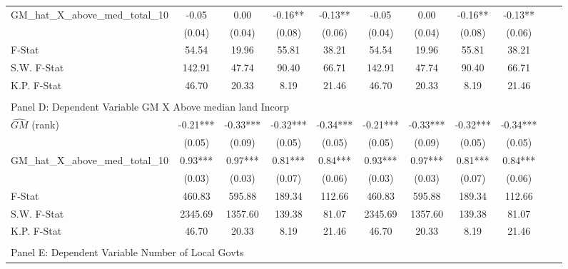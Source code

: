 \begin{table}[htbp]
\begin{threeparttable}
\begin{tabular}{l*{10}{c}}
\addlinespace
GM\_hat\_X\_above\_med\_total\_10&      -0.05   &       0.00   &      -0.16** &      -0.13** &      -0.05   &       0.00   &      -0.16** &      -0.13** \\
                &     (0.04)   &     (0.04)   &     (0.08)   &     (0.06)   &     (0.04)   &     (0.04)   &     (0.08)   &     (0.06)   \\
\midrule
F-Stat          &      54.54   &      19.96   &      55.81   &      38.21   &      54.54   &      19.96   &      55.81   &      38.21   \\
S.W. F-Stat     &     142.91   &      47.74   &      90.40   &      66.71   &     142.91   &      47.74   &      90.40   &      66.71   \\
K.P. F-Stat     &      46.70   &      20.33   &       8.19   &      21.46   &      46.70   &      20.33   &       8.19   &      21.46   \\
\cmidrule[\heavyrulewidth](lr){1-9} \\ \cmidrule[\heavyrulewidth](lr){1-9}
\multicolumn{8}{l}{Panel D: Dependent Variable GM X Above median land Incorp}\\
\cmidrule(lr){1-9}
$\hat{GM}$ (rank)&      -0.21***&      -0.33***&      -0.32***&      -0.34***&      -0.21***&      -0.33***&      -0.32***&      -0.34***\\
                &     (0.05)   &     (0.09)   &     (0.05)   &     (0.05)   &     (0.05)   &     (0.09)   &     (0.05)   &     (0.05)   \\
\addlinespace
GM\_hat\_X\_above\_med\_total\_10&       0.93***&       0.97***&       0.81***&       0.84***&       0.93***&       0.97***&       0.81***&       0.84***\\
                &     (0.03)   &     (0.03)   &     (0.07)   &     (0.06)   &     (0.03)   &     (0.03)   &     (0.07)   &     (0.06)   \\
\midrule
F-Stat          &     460.83   &     595.88   &     189.34   &     112.66   &     460.83   &     595.88   &     189.34   &     112.66   \\
S.W. F-Stat     &    2345.69   &    1357.60   &     139.38   &      81.07   &    2345.69   &    1357.60   &     139.38   &      81.07   \\
K.P. F-Stat     &      46.70   &      20.33   &       8.19   &      21.46   &      46.70   &      20.33   &       8.19   &      21.46   \\
\cmidrule[\heavyrulewidth](lr){1-9} \\ \cmidrule[\heavyrulewidth](lr){1-9}
\multicolumn{8}{l}{Panel E: Dependent Variable Number of Local Govts}\\

\end{tabular}
\end{threeparttable}
\end{table}

